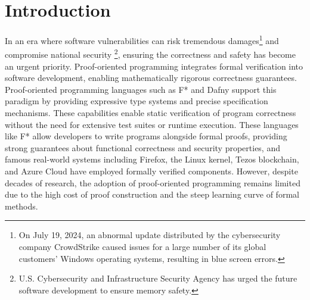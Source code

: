\section{Introduction}
In an era where software vulnerabilities can risk tremendous damages\footnote{On July 19, 2024, an abnormal update distributed by the cybersecurity company CrowdStrike caused issues for a large number of its global customers’ Windows operating systems, resulting in blue screen errors.} and compromise national security \footnote{U.S. Cybersecurity and Infrastructure Security Agency has urged the future software development to ensure memory safety.}, ensuring the correctness and safety has become an urgent priority. Proof-oriented programming integrates formal verification into software development, enabling mathematically rigorous correctness guarantees.
 Proof-oriented programming languages such as F*\cite{swamy2011secure} and Dafny\cite{dafny} support this paradigm by providing expressive type systems and precise specification mechanisms. These capabilities enable static verification of program correctness without the need for extensive test suites or runtime execution. These languages like F* allow developers to write programs alongside formal proofs, providing strong guarantees about functional correctness and security properties, and famous real-world systems including Firefox, the Linux kernel, Tezos blockchain, and Azure Cloud have employed formally verified components.%
 However, despite decades of research, the adoption of proof-oriented programming remains limited due to the high cost of proof construction and the steep learning curve of formal methods.

